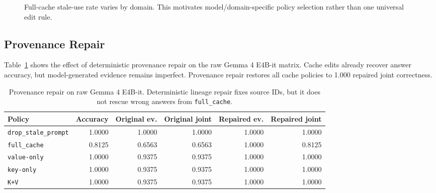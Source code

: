 \documentclass[11pt]{article}
\newcommand{\fullcache}{\texttt{full\_cache}}
\newcommand{\promptdelete}{\texttt{drop\_stale\_prompt}}
\newcommand{\valueedit}{\texttt{value-only}}
\newcommand{\keyedit}{\texttt{key-only}}
\newcommand{\kvedit}{\texttt{K+V}}
\newcommand{\gemma}{Gemma 4 E4B-it}
\begin{document}
\begin{figure}[H]
\centering
{}
\caption{Full-cache stale-use rate varies by domain. This motivates
model/domain-specific policy selection rather than one universal edit rule.}
\label{fig:domain-stale}
\end{figure}

\subsection{Provenance Repair}

Table~\ref{tab:provenance} shows the effect of deterministic provenance repair
on the raw \gemma{} matrix. Cache edits already recover answer accuracy, but
model-generated evidence remains imperfect. Provenance repair restores all
cache policies to 1.000 repaired joint correctness.

\begin{table}[H]
\centering
\small
\begin{tabular}{lrrrrr}
\toprule
\textbf{Policy} & \textbf{Accuracy} & \textbf{Original ev.} & \textbf{Original joint} & \textbf{Repaired ev.} & \textbf{Repaired joint} \\
\midrule
\promptdelete & 1.0000 & 1.0000 & 1.0000 & 1.0000 & 1.0000 \\
\fullcache & 0.8125 & 0.6563 & 0.6563 & 1.0000 & 0.8125 \\
\valueedit & 1.0000 & 0.9375 & 0.9375 & 1.0000 & 1.0000 \\
\keyedit & 1.0000 & 0.9375 & 0.9375 & 1.0000 & 1.0000 \\
\kvedit & 1.0000 & 0.9375 & 0.9375 & 1.0000 & 1.0000 \\
\bottomrule
\end{tabular}
\caption{Provenance repair on raw \gemma{}. Deterministic lineage repair fixes
source IDs, but it does not rescue wrong answers from \fullcache{}.}
\label{tab:provenance}
\end{table}
\end{document}
